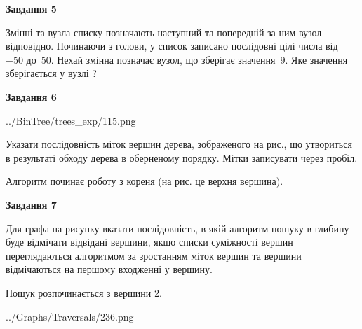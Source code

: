 \documentclass[12pt, ukrainian]{article}
\begin{document}
{\begin {large}
{\begin {center}\textbf{Завдання 5}\end {center}}\par
Змінні  та  вузла списку позначають наступний та попередній за ним вузол відповідно. Починаючи з голови, у список записано послідовні цілі числа від~$-50$ до~$50$. Нехай змінна  позначає вузол, що зберігає значення~$9$.
Яке значення зберігається у вузлі  ?\par
\newpage

{\begin {center}\textbf{Завдання 6}\end {center}}\par

\begin{center}
	{../BinTree/trees_exp/115.png}
\end{center}
Указати послідовність міток вершин дерева, зображеного на рис., що утвориться в результаті обходу дерева в оберненому порядку. Мітки записувати через пробіл.\par Алгоритм починає роботу з кореня (на рис. це верхня вершина).\par
\newpage

{\begin {center}\textbf{Завдання 7}\end {center}}\par
Для графа на рисунку вказати послідовність, в якій алгоритм пошуку в глибину буде відмічати відвідані вершини, якщо списки суміжності вершин переглядаються алгоритмом за зростанням міток вершин та вершини відмічаються на першому вход\-женні у вершину.\par
Пошук розпочинається з вершини 2.\par

\begin{center}
	{../Graphs/Traversals/236.png}
\end{center}\par
\newpage


\end{large}}
\end{document}
